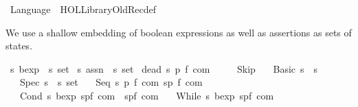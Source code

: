 %
\begin{isabellebody}%
%
%
\isamarkuptrue%
%
\isadelimtheory
%
\endisadelimtheory
%
\isatagtheory
{}\isamarkupfalse%
\ Language\ \ {\isachardoublequoteopen}HOL{\isacharminus}Library{\isachardot}Old{\isacharunderscore}Recdef{\isachardoublequoteclose}\ %
\endisatagtheory
{\isafoldtheory}%
%
\isadelimtheory
%
\endisadelimtheory
%
\isamarkuptrue%
%
\begin{isamarkuptext}%
We use a shallow embedding of boolean expressions as well as assertions
as sets of states.%
\end{isamarkuptext}\isamarkuptrue%
\isamarkupfalse%
\ {\isacharprime}s\ bexp\ {\isacharequal}\ {\isachardoublequoteopen}{\isacharprime}s\ set{\isachardoublequoteclose}\isanewline
{}\isamarkupfalse%
\ {\isacharprime}s\ assn\ {\isacharequal}\ {\isachardoublequoteopen}{\isacharprime}s\ set{\isachardoublequoteclose}\isanewline
\isanewline
{}\isamarkupfalse%
\ {\isacharparenleft}dead\ {\isacharprime}s{\isacharcomma}\ {\isacharprime}p{\isacharcomma}\ {\isacharprime}f{\isacharparenright}\ com\ {\isacharequal}\isanewline
\ \ \ \ Skip\isanewline
\ \ {\isacharbar}\ Basic\ {\isachardoublequoteopen}{\isacharprime}s\ {\isasymRightarrow}\ {\isacharprime}s{\isachardoublequoteclose}\isanewline
\ \ {\isacharbar}\ Spec\ {\isachardoublequoteopen}{\isacharparenleft}{\isacharprime}s\ {\isasymtimes}\ {\isacharprime}s{\isacharparenright}\ set{\isachardoublequoteclose}\isanewline
\ \ {\isacharbar}\ Seq\ {\isachardoublequoteopen}{\isacharparenleft}{\isacharprime}s\ {\isacharcomma}{\isacharprime}p{\isacharcomma}\ {\isacharprime}f{\isacharparenright}\ com{\isachardoublequoteclose}\ {\isachardoublequoteopen}{\isacharparenleft}{\isacharprime}s{\isacharcomma}{\isacharprime}p{\isacharcomma}\ {\isacharprime}f{\isacharparenright}\ com{\isachardoublequoteclose}\ \ \ \ \isanewline
\ \ {\isacharbar}\ Cond\ {\isachardoublequoteopen}{\isacharprime}s\ bexp{\isachardoublequoteclose}\ {\isachardoublequoteopen}{\isacharparenleft}{\isacharprime}s{\isacharcomma}{\isacharprime}p{\isacharcomma}{\isacharprime}f{\isacharparenright}\ com{\isachardoublequoteclose}\ \ {\isachardoublequoteopen}{\isacharparenleft}{\isacharprime}s{\isacharcomma}{\isacharprime}p{\isacharcomma}{\isacharprime}f{\isacharparenright}\ com{\isachardoublequoteclose}\isanewline
\ \ {\isacharbar}\ While\ {\isachardoublequoteopen}{\isacharprime}s\ bexp{\isachardoublequoteclose}\ {\isachardoublequoteopen}{\isacharparenleft}{\isacharprime}s{\isacharcomma}{\isacharprime}p{\isacharcomma}{\isacharprime}f{\isacharparenright}\ com{\isachardoublequoteclose}\isanewline

\end{isabellebody}
